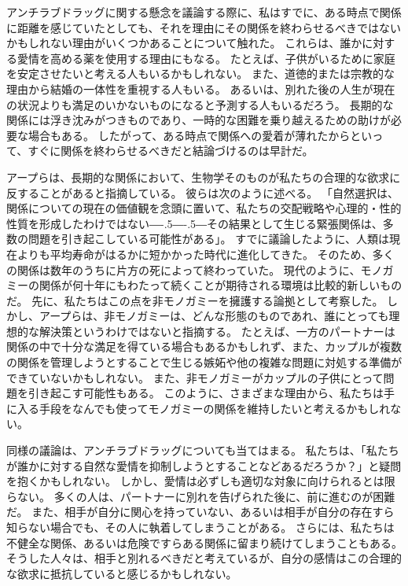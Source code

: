 \documentclass[paper=a4,book,openany]{jlreq}
\def\DDASH{―\kern-.5\zw―\kern-.5\zw―} %
\begin{document}
アンチラブドラッグに関する懸念を議論する際に、私はすでに、ある時点で関係に距離を感じていたとしても、それを理由にその関係を終わらせるべきではないかもしれない理由がいくつかあることについて触れた。
これらは、誰かに対する愛情を高める薬を使用する理由にもなる。
たとえば、子供がいるために家庭を安定させたいと考える人もいるかもしれない。
また、道徳的または宗教的な理由から結婚の一体性を重視する人もいる。
あるいは、別れた後の人生が現在の状況よりも満足のいかないものになると予測する人もいるだろう。
長期的な関係には浮き沈みがつきものであり、一時的な困難を乗り越えるための助けが必要な場合もある。
したがって、ある時点で関係への愛着が薄れたからといって、すぐに関係を終わらせるべきだと結論づけるのは早計だ。

アープらは、長期的な関係において、生物学そのものが私たちの合理的な欲求に反することがあると指摘している。
彼らは次のように述べる。
「自然選択は、関係についての現在の価値観を念頭に置いて、私たちの交配戦略や心理的・性的性質を形成したわけではない{\DDASH}その結果として生じる緊張関係は、多数の問題を引き起こしている可能性がある」\citep[p.567]{earp12:_natur_selec_child_ethic_marriag_divor}。
すでに議論したように、人類は現在よりも平均寿命がはるかに短かかった時代に進化してきた。
そのため、多くの関係は数年のうちに片方の死によって終わっていた。
現代のように、モノガミーの関係が何十年にもわたって続くことが期待される環境は比較的新しいものだ。
先に、私たちはこの点を非モノガミーを擁護する論拠として考察した。
しかし、アープらは、非モノガミーは、どんな形態のものであれ、誰にとっても理想的な解決策というわけではないと指摘する。
たとえば、一方のパートナーは関係の中で十分な満足を得ている場合もあるかもしれず、また、カップルが複数の関係を管理しようとすることで生じる嫉妬や他の複雑な問題に対処する準備ができていないかもしれない。
また、非モノガミーがカップルの子供にとって問題を引き起こす可能性もある\citep[p.48]{earp20:_love_drugs}。
このように、さまざまな理由から、私たちは手に入る手段をなんでも使ってモノガミーの関係を維持したいと考えるかもしれない。

同様の議論は、アンチラブドラッグについても当てはまる。
私たちは、「私たちが誰かに対する自然な愛情を抑制しようとすることなどあるだろうか？」と疑問を抱くかもしれない。
しかし、愛情は必ずしも適切な対象に向けられるとは限らない。
多くの人は、パートナーに別れを告げられた後に、前に進むのが困難だ。
また、相手が自分に関心を持っていない、あるいは相手が自分の存在すら知らない場合でも、その人に執着してしまうことがある。
さらには、私たちは不健全な関係、あるいは危険ですらある関係に留まり続けてしまうこともある。
そうした人々は、相手と別れるべきだと考えているが、自分の感情はこの合理的な欲求に抵抗していると感じるかもしれない。
\end{document}
